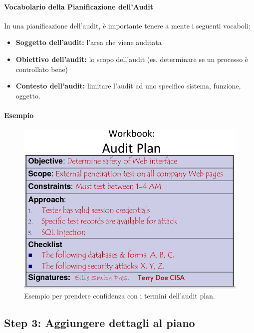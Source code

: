 \paragraph{Vocabolario della Pianificazione dell'Audit}
\newline
In una pianificazione dell'audit, è importante tenere a mente i seguenti 
vocaboli:
\begin{itemize}
\item \textbf{Soggetto dell'audit:} l'area che viene auditata
\item \textbf{Obiettivo dell'audit:} lo scopo dell'audit (es. determinare se un processo 
è controllato bene)
\item \textbf{Contesto dell'audit:} limitare l'audit ad uno specifico sistema, funzione, 
oggetto.
\end{itemize}


\paragraph*{Esempio}

\begin{figure}[H]
	\begin{center}	
\includegraphics[scale=0.3]{res/img/audit_plan_vocabulary_example.png}
	\end{center}
	\caption{Esempio per prendere confidenza con i termini dell'audit plan.}
	\label{fig:audit:plan:vocabulary:example}
\end{figure}

\subsection{Step 3: Aggiungere dettagli al piano}

